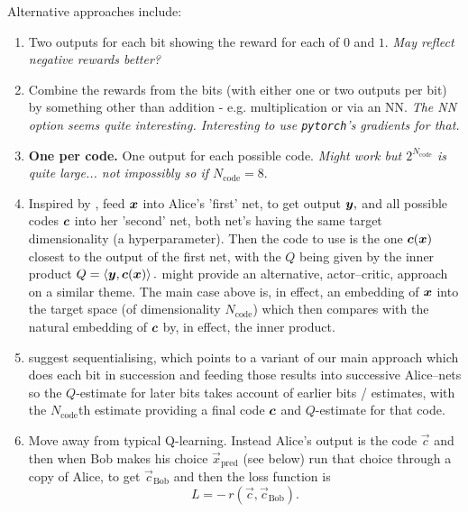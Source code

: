 \documentclass[12pt]{article}
\begin{document}
Alternative approaches include:
\begin{enumerate}
	\item Two outputs for each bit showing the reward for each of $0$ and $1.$  {\em May reflect negative rewards better?}
	
	\item Combine the rewards from the bits (with either one or two outputs per bit) by something other than addition - e.g. multiplication or via an NN. {\em The NN option seems quite interesting.  Interesting to use \verb|pytorch|'s gradients for that.}
	
	\item {\bf One per code.} One output for each possible code. {\em Might work but $2^{N_\text{code}}$ is quite large... not impossibly so if $N_\text{code}=8.$}
	
	\item Inspired by , feed $\boldsymbol{x}$ into Alice's 'first' net, to get output $\boldsymbol{y},$ and all possible codes $\boldsymbol{c}$ into her 'second' net, both net's having the same target dimensionality (a hyperparameter).  Then the code to use is the one $\boldsymbol{c}(\boldsymbol{x})$ closest to the output of the first net, with the $Q$ being given by the inner product $Q = \left\langle \boldsymbol{y}, \boldsymbol{c}(\boldsymbol{x}) \right\rangle.$   might provide an alternative, actor--critic, approach on a similar theme.  The main case above is, in effect, an embedding of $\boldsymbol{x}$ into the target space (of dimensionality $N_\text{code}$) which then compares with the natural embedding of $\boldsymbol{c}$ by, in effect, the inner product.
	
	\item {} suggest sequentialising, which points to a variant of our main approach which does each bit in succession and feeding those results into successive Alice--nets so the $Q$-estimate for later bits takes account of earlier bits / estimates, with the $N_\text{code}$th estimate providing a final code $\boldsymbol{c}$ and $Q$-estimate for that code.
	
	\item Move away from typical Q-learning.  Instead Alice's output is the code $\vec{c}$ and then when Bob makes his choice $\vec{x}_\text{pred}$ (see below) run that choice through a copy of Alice, to get $\vec{c}_\text{Bob}$ and then the loss function is
	\begin{equation}
		L
		=
		-\,
		r(\vec{c}, \vec{c}_\text{Bob})
		.
	\end{equation}
\end{enumerate}
\end{document}
